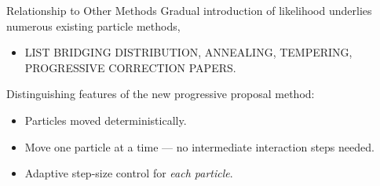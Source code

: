 \documentclass{beamer}
\begin{document}
\begin{frame}{Relationship to Other Methods}
Gradual introduction of likelihood underlies numerous existing particle methods,
\begin{itemize}
 \item LIST BRIDGING DISTRIBUTION, ANNEALING, TEMPERING, PROGRESSIVE CORRECTION PAPERS.
\end{itemize}
Distinguishing features of the new progressive proposal method:
\begin{itemize}
 \item Particles moved deterministically.
 \item Move one particle at a time --- no intermediate interaction steps needed.
 \item Adaptive step-size control for \emph{each particle}.
\end{itemize}
\end{frame}
\end{document}
